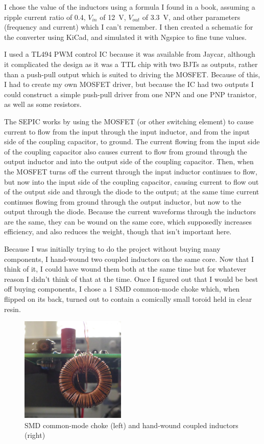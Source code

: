 \documentclass[a4paper]{article}
\begin{document}
I chose the value of the inductors using a formula I found in a book,
assuming a ripple current ratio of 0.4, \(V_{in}\) of \qty{12}{\V}, \(V_{out}\) of
\qty{3.3}{\V}, and other parameters (frequency and current) which I can't
remember. I then created a schematic for the converter using KiCad,
and simulated it with Ngspice to fine tune values.

I used a TL494 PWM control IC because it was available from Jaycar,
although it complicated the design as it was a TTL chip with two
BJTs as outputs, rather than a push-pull output which is suited to
driving the MOSFET. Because of this, I had to create my own MOSFET
driver, but because the IC had two outputs I could construct a simple
push-pull driver from one NPN and one PNP tranistor, as well as some
resistors.

The SEPIC works by using the MOSFET (or other switching element) to
cause current to flow from the input through the input inductor, and
from the input side of the coupling capacitor, to ground. The current
flowing from the input side of the coupling capacitor also causes
current to flow from ground through the output inductor and into the
output side of the coupling capacitor. Then, when the MOSFET turns off
the current through the input inductor continues to flow, but now into
the input side of the coupling capacitor, causing current to flow out
of the output side and through the diode to the output; at the same
time current continues flowing from ground through the output
inductor, but now to the output through the diode. Because the current
waveforms through the inductors are the same, they can be wound on the
same core, which supposedly increases efficiency, and also reduces the
weight, though that isn't important here.

Because I was initially trying to do the project without buying many
components, I hand-wound two coupled inductors on the same core. Now
that I think of it, I could have wound them both at the same time but
for whatever reason I didn't think of that at the time. Once I figured
out that I would be best off buying components, I chose a \qty{1}{\uH}
SMD common-mode choke which, when flipped on its back, turned out to
contain a comically small toroid held in clear resin.

\begin{figure}
  \centering
  \includegraphics[height=5cm]{inductors}
  \caption[Inductors]{SMD common-mode choke (left) and hand-wound
    coupled inductors (right)}
\end{figure}
\end{document}
